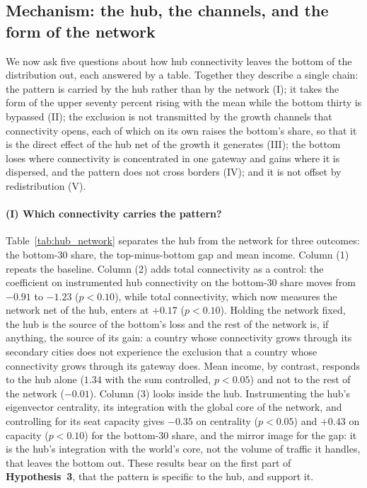 \subsection{Mechanism: the hub, the channels, and the form of the network}
\label{sec:mechanism}
We now ask five questions about how hub connectivity leaves the bottom of the distribution out, each answered by a table. Together they describe a single chain: the pattern is carried by the hub rather than by the network (I); it takes the form of the upper seventy percent rising with the mean while the bottom thirty is bypassed (II); the exclusion is not transmitted by the growth channels that connectivity opens, each of which on its own raises the bottom's share, so that it is the direct effect of the hub net of the growth it generates (III); the bottom loses where connectivity is concentrated in one gateway and gains where it is dispersed, and the pattern does not cross borders (IV); and it is not offset by redistribution (V).

\paragraph{(I) Which connectivity carries the pattern?}
Table~\ref{tab:hub_network} separates the hub from the network for three outcomes: the bottom-30 share, the top-minus-bottom gap and mean income. Column (1) repeats the baseline. Column (2) adds total connectivity as a control: the coefficient on instrumented hub connectivity on the bottom-30 share moves from $-0.91$ to $-1.23$ ($p<0.10$), while total connectivity, which now measures the network net of the hub, enters at $+0.17$ ($p<0.10$). Holding the network fixed, the hub is the source of the bottom's loss and the rest of the network is, if anything, the source of its gain: a country whose connectivity grows through its secondary cities does not experience the exclusion that a country whose connectivity grows through its gateway does. Mean income, by contrast, responds to the hub alone ($1.34$ with the sum controlled, $p<0.05$) and not to the rest of the network ($-0.01$). Column (3) looks inside the hub. Instrumenting the hub's eigenvector centrality, its integration with the global core of the network, and controlling for its seat capacity gives $-0.35$ on centrality ($p<0.05$) and $+0.43$ on capacity ($p<0.10$) for the bottom-30 share, and the mirror image for the gap: it is the hub's integration with the world's core, not the volume of traffic it handles, that leaves the bottom out. These results bear on the first part of \textbf{Hypothesis~3}, that the pattern is specific to the hub, and support it.

